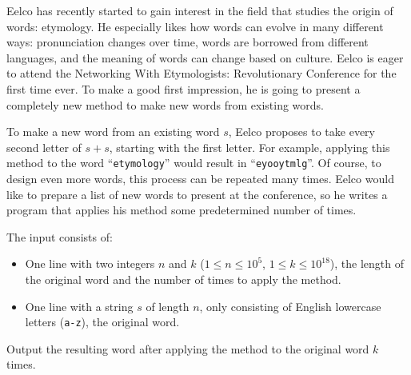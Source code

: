 

\newcommand{\protagonist}{Eelco}

\protagonist{} has recently started to gain interest in the field that studies the origin of words: etymology.
He especially likes how words can evolve in many different ways:
pronunciation changes over time,
words are borrowed from different languages,
and the meaning of words can change based on culture.
\protagonist{} is eager to attend the Networking With Etymologists: Revolutionary Conference for the first time ever.
To make a good first impression,
he is going to present a completely new method to make new words from existing words.

To make a new word from an existing word $s$,
\protagonist{} proposes to take every second letter of $s+s$,
starting with the first letter.
For example, applying this method to the word ``\texttt{etymology}'' would result in ``\texttt{eyooytmlg}''.
Of course, to design even more words, this process can be repeated many times.
\protagonist{} would like to prepare a list of new words to present at the conference,
so he writes a program that applies his method some predetermined number of times.

\begin{Input}
    The input consists of:
    \begin{itemize}
        \item One line with two integers $n$ and $k$ ($1 \leq n \leq 10^5$, $1 \leq k \leq 10^{18}$),
            the length of the original word and the number of times to apply the method.
        \item One line with a string $s$ of length $n$, only consisting of English lowercase letters (\texttt{a-z}),
            the original word.
    \end{itemize}
\end{Input}

\begin{Output}
    Output the resulting word after applying the method to the original word $k$ times.
\end{Output}

